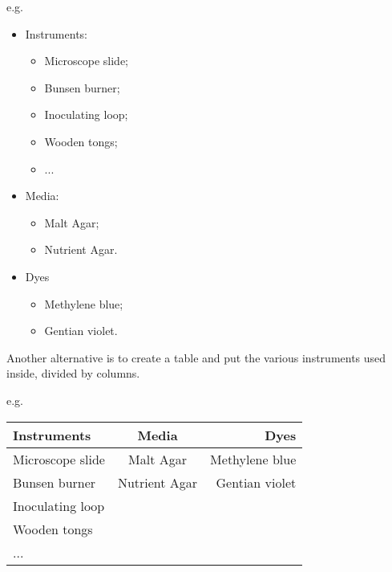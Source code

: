 e.g.
\begin{multicols}{2}
\begin{itemize}
    \item Instruments:
    \begin{itemize}
        \item Microscope slide;
        \item Bunsen burner;
        \item Inoculating loop;
        \item Wooden tongs;
        \item ...
    \end{itemize}
    \item Media:
    \begin{itemize}
    \item Malt Agar;
    \item Nutrient Agar.
    \end{itemize}
    \item Dyes
    \begin{itemize}
        \item Methylene blue;
        \item Gentian violet.
    \end{itemize}
\end{itemize}
\end{multicols}

Another alternative is to create a table and put the various instruments used inside, divided by columns.

e.g.
\begin{center}
   \begin{tabular}{l|c|r}
   \toprule
     \textbf{Instruments} &  \textbf{Media} & \textbf{Dyes}\\
    \midrule
     Microscope slide & Malt Agar & Methylene blue\\
     Bunsen burner & Nutrient Agar & Gentian violet\\
     Inoculating loop & & \\
     Wooden tongs & & \\
     ... & & \\
     \bottomrule
    \end{tabular} 
\end{center}
